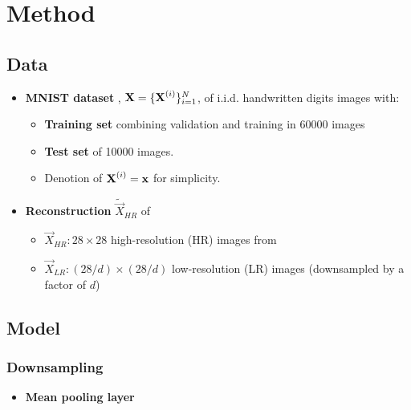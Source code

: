 \section{Method}
\label{sec:method}

\subsection{Data} %
\label{sub:data}
\begin{itemize}
	\item \textbf{MNIST dataset} \cite{MNIST}, $\bm{\mathrm{X}} = \{\bm{\mathrm{X}}^{(i)}\}^N_{i=1}$, of i.i.d. handwritten digits images with:
	\begin{itemize}
		\item \textbf{Training set} combining validation and training in 60000 images 
		\item \textbf{Test set} of 10000 images.
		\item Denotion of $\bm{\mathrm{X}}^{(i)} = \bm{\mathrm{x}}$ for simplicity. 
	\end{itemize}
	\item \textbf{Reconstruction} $\tilde{\vec{X}}_{HR}$ of 
	\begin{itemize}
		\item $\vec{X}_{HR}: 28\times 28$ high-resolution (HR) images from
		\item $\vec{X}_{LR}: (28/d)\times (28/d)$ low-resolution (LR) images (downsampled by a factor of $d$)
	\end{itemize} 
\end{itemize}

\subsection{Model} %
\label{sub:the_model}

	

\subsubsection{Downsampling} %
\label{ssub:downsampling}
\begin{itemize}
	\item \textbf{Mean pooling layer}
\end{itemize}

